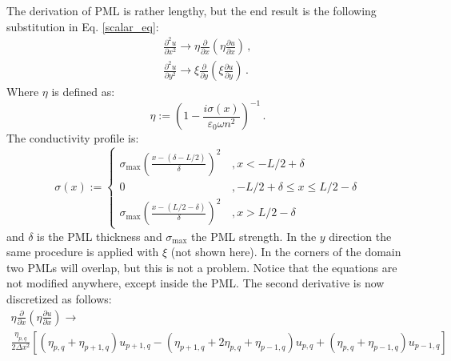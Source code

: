 \documentclass[]{article}
\begin{document}
	The derivation of PML is rather lengthy, but the end result is the following substitution in Eq. \eqref{scalar_eq}:
	\begin{subequations}
		\begin{align}
			\frac{\partial^2 u}{\partial x^2} \to \eta \frac{\partial}{\partial x}\left(  \eta \frac{\partial u}{\partial x}\right) \, ,\\
			\frac{\partial^2 u}{\partial y^2} \to \xi \frac{\partial}{\partial y}\left(  \xi \frac{\partial u}{\partial y}\right) \, .
		\end{align}
	\end{subequations}
	Where $\eta$ is defined as:
	\begin{equation}
		\eta := \left(1-\frac{i\sigma(x)}{\varepsilon_0 \omega n^2} \right)^{-1}\, .
	\end{equation}
	The conductivity profile is:
	\begin{equation}
		\sigma(x):= \begin{cases}
			\sigma_{\text{max}}\left( \frac{x-(\delta-L/2)}{\delta}\right)^2 \, &, x <-L/2+\delta\\
			0&, -L/2+\delta \le x \le L/2 - \delta\\
			\sigma_{\text{max}}\left( \frac{x-(L/2-\delta)}{\delta}\right)^2 \, &, x > L/2 - \delta
		\end{cases}
	\end{equation}
	and $\delta$ is the PML thickness and $\sigma_{\text{max}}$ the PML strength. In the $y$ direction the same procedure is applied with $\xi$ (not shown here). In the corners of the domain two PMLs will overlap, but this is not a problem. Notice that the equations are not modified anywhere, except inside the PML. The second derivative is now discretized as follows:
	\begin{multline}
		\eta \frac{\partial}{\partial x}\left(  \eta \frac{\partial u}{\partial x}\right)  \to\\
		\frac{\eta_{p,q}}{2\Delta x^2}\left[(\eta_{p,q}+\eta_{p+1,q})u_{p+1,q} -(\eta_{p+1,q}+2\eta_{p,q}+\eta_{p-1,q})u_{p,q}+(\eta_{p,q}+\eta_{p-1,q})u_{p-1,q}\right] 
	\end{multline}
	
	
	
	
	
	
\end{document}
